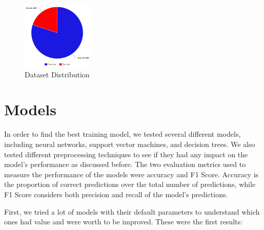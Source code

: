 \documentclass[conference]{IEEEtran}
\begin{document}
\begin{figure}[!h]
    \centering
    \includegraphics[width=0.3\textwidth]{assets/meta-chart.png}
    \caption{Dataset Distribution}
    \label{fig:dataset-dist}
\end{figure}
\section{Models}
In order to find the best training model, we tested several different models, including neural networks, support vector machines, and decision trees. We also tested different preprocessing techniques to see if they had any impact on the model's performance as discussed before.
The two evaluation metrics used to measure the performance of the models were accuracy and F1 Score. Accuracy is the proportion of correct predictions over the total number of predictions, while F1 Score considers both precision and recall of the model's predictions.

First, we tried a lot of models with their default parameters to understand which ones had value
and were worth to be improved. These were the first results: 
\end{document}
